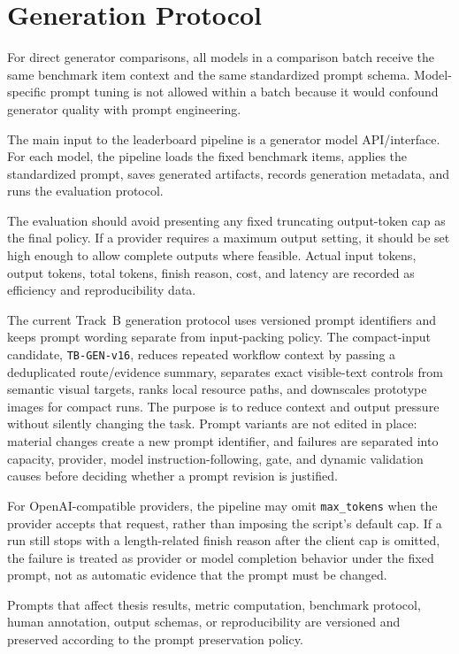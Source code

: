 \section{Generation Protocol}
\label{sec:generation-protocol}

For direct generator comparisons, all models in a comparison batch receive the
same benchmark item context and the same standardized prompt schema. Model-
specific prompt tuning is not allowed within a batch because it would confound
generator quality with prompt engineering.

The main input to the leaderboard pipeline is a generator model API/interface.
For each model, the pipeline loads the fixed benchmark items, applies the
standardized prompt, saves generated artifacts, records generation metadata, and
runs the evaluation protocol.

The evaluation should avoid presenting any fixed truncating output-token cap as
the final policy. If a provider requires a maximum output setting, it should be
set high enough to allow complete outputs where feasible. Actual input tokens,
output tokens, total tokens, finish reason, cost, and latency are recorded as
efficiency and reproducibility data.

The current Track~B generation protocol uses versioned prompt identifiers and
keeps prompt wording separate from input-packing policy. The compact-input
candidate, \texttt{TB-GEN-v16}, reduces repeated workflow context by passing a
deduplicated route/evidence summary, separates exact visible-text controls from
semantic visual targets, ranks local resource paths, and downscales prototype
images for compact runs. The purpose is to reduce context and output pressure
without silently changing the task. Prompt variants are not edited in place:
material changes create a new prompt identifier, and failures are separated
into capacity, provider, model instruction-following, gate, and dynamic
validation causes before deciding whether a prompt revision is justified.

For OpenAI-compatible providers, the pipeline may omit \texttt{max\_tokens}
when the provider accepts that request, rather than imposing the script's
default cap. If a run still stops with a length-related finish reason after the
client cap is omitted, the failure is treated as provider or model completion
behavior under the fixed prompt, not as automatic evidence that the prompt must
be changed.

Prompts that affect thesis results, metric computation, benchmark protocol,
human annotation, output schemas, or reproducibility are versioned and preserved
according to the prompt preservation policy.

